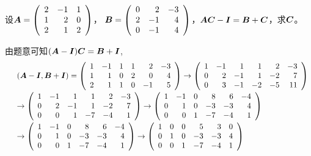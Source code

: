 \begin{frame}
\begin{li}[2007-2008第二学期]
设$\boldsymbol{A}=\left(
\begin{array}{rrr}
2&-1&1\\
1&2&0\\
2&1&2
\end{array}
\right)$， $\boldsymbol{B}=\left(
\begin{array}{rrr}
0&2&-3\\
2&-1&4\\
0&-1&4
\end{array}
\right)$，$\boldsymbol{A}\boldsymbol{C}-\boldsymbol{I}=\boldsymbol{B}+\boldsymbol{C}$，求$\boldsymbol{C}$。
\end{li}
\pause

\begin{jie}
由题意可知$(\boldsymbol{A}-\boldsymbol{I})\boldsymbol{C}=\boldsymbol{B}+\boldsymbol{I}$,
$$
\begin{array}{rl}
&(\boldsymbol{A}-\boldsymbol{I},\boldsymbol{B}+\boldsymbol{I})=\left(
\begin{array}{rrrrrr}
1&-1&1 &1&2&-3\\
1&1&0 &2&0&4\\
2&1&1&0&-1&5
\end{array}
\right)\rightarrow\left(
\begin{array}{rrrrrr}
1&-1&1 &1&2&-3\\
0&2&-1 &1&-2&7\\
0&3&-1&-2&-5&11
\end{array}
\right)\\[0.2in]
&\rightarrow\left(
\begin{array}{rrrrrr}
1&-1&1 &1&2&-3\\
0&2&-1 &1&-2&7\\
0&0&1&-7&-4&1
\end{array}
\right) \rightarrow\left(
\begin{array}{rrrrrr}
1&-1&0 &8&6&-4\\
0&1&0 &-3&-3&4\\
0&0&1&-7&-4&1
\end{array}
\right)\\[0.2in]
& \rightarrow\left(
\begin{array}{rrrrrr}
1&-1&0 &8&6&-4\\
0&1&0 &-3&-3&4\\
0&0&1&-7&-4&1
\end{array}
\right) \rightarrow\left(
\begin{array}{rrrrrr}
1&0&0 &5&3&0\\
0&1&0 &-3&-3&4\\
0&0&1&-7&-4&1
\end{array}
\right)
\end{array}
$$
\end{jie}
\end{frame}



